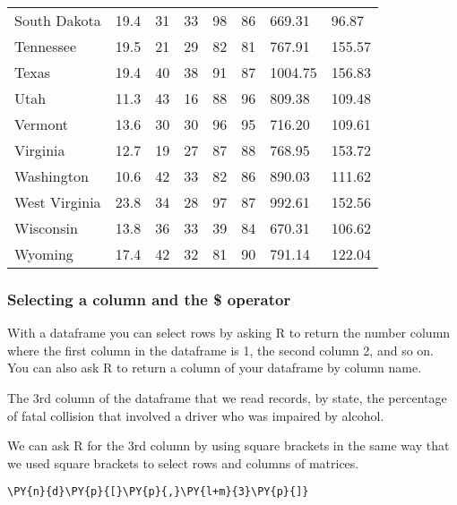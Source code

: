 \begin{tabular}{llllllll}
	 South Dakota         & 19.4 & 31 & 33 &  98 &  86 &  669.31 &  96.87\\
	 Tennessee            & 19.5 & 21 & 29 &  82 &  81 &  767.91 & 155.57\\
	 Texas                & 19.4 & 40 & 38 &  91 &  87 & 1004.75 & 156.83\\
	 Utah                 & 11.3 & 43 & 16 &  88 &  96 &  809.38 & 109.48\\
	 Vermont              & 13.6 & 30 & 30 &  96 &  95 &  716.20 & 109.61\\
	 Virginia             & 12.7 & 19 & 27 &  87 &  88 &  768.95 & 153.72\\
	 Washington           & 10.6 & 42 & 33 &  82 &  86 &  890.03 & 111.62\\
	 West Virginia        & 23.8 & 34 & 28 &  97 &  87 &  992.61 & 152.56\\
	 Wisconsin            & 13.8 & 36 & 33 &  39 &  84 &  670.31 & 106.62\\
	 Wyoming              & 17.4 & 42 & 32 &  81 &  90 &  791.14 & 122.04\\
\end{tabular}


    
    \hypertarget{selecting-a-column-and-the-operator}{%
\subsubsection{Selecting a column and the \$
operator}\label{selecting-a-column-and-the-operator}}

With a dataframe you can select rows by asking R to return the number
column where the first column in the dataframe is 1, the second column
2, and so on. You can also ask R to return a column of your dataframe by
column name.

The 3rd column of the dataframe that we read records, by state, the
percentage of fatal collision that involved a driver who was impaired by
alcohol.

We can ask R for the 3rd column by using square brackets in the same way
that we used square brackets to select rows and columns of matrices.

    \begin{tcolorbox}[breakable, size=fbox, boxrule=1pt, pad at break*=1mm,colback=cellbackground, colframe=cellborder]
\begin{Verbatim}[commandchars=\\\{\}]
\PY{n}{d}\PY{p}{[}\PY{p}{,}\PY{l+m}{3}\PY{p}{]}
\end{Verbatim}
\end{tcolorbox}

